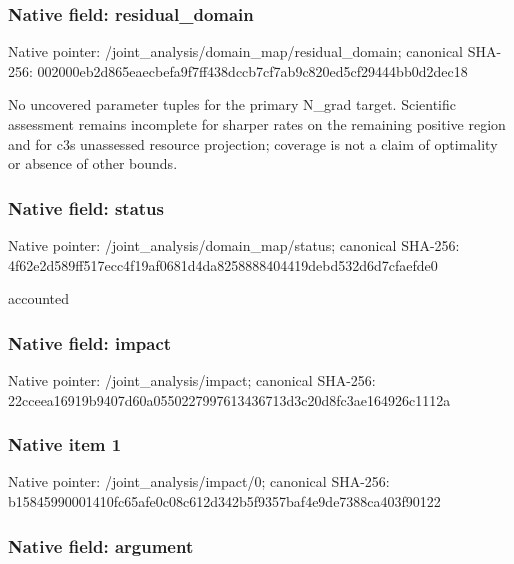 \documentclass[10pt,a4paper]{article}
\begin{document}
\subsubsection{Native field: residual\_domain}


Native pointer: /joint\_analysis/domain\_m\allowbreak{}ap/residual\_domain; canonical SHA-256: 002000eb2d865eaecbefa9f7\allowbreak{}ff438dccb7cf7ab9c820ed5c\allowbreak{}f29444bb0d2dec18


No uncovered parameter tuples for the primary N\_grad target. Scientific assessment remains incomplete for sharper rates on the remaining positive region and for c3s unassessed resource projection; coverage is not a claim of optimality or absence of other bounds.


\subsubsection{Native field: status}


Native pointer: /joint\_analysis/domain\_map/status; canonical SHA-256: 4f62e2d589ff517ecc4f19af\allowbreak{}0681d4da8258888404419deb\allowbreak{}d532d6d7cfaefde0


accounted


\subsubsection{Native field: impact}


Native pointer: /joint\_analysis/impact; canonical SHA-256: 22cceea16919b9407d60a055\allowbreak{}0227997613436713d3c20d8f\allowbreak{}c3ae164926c1112a



\subsubsection{Native item 1}


Native pointer: /joint\_analysis/impact/0; canonical SHA-256: b15845990001410fc65afe0c\allowbreak{}08c612d342b5f9357baf4e9d\allowbreak{}e7388ca403f90122



\subsubsection{Native field: argument}
\end{document}
